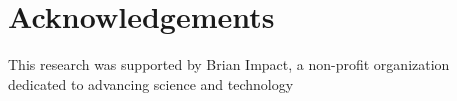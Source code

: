 \documentclass[letterpaper]{article} %
\begin{document}
\section{Acknowledgements}
This research was supported by Brian Impact, a non-profit organization dedicated to advancing science and technology

\end{document}
